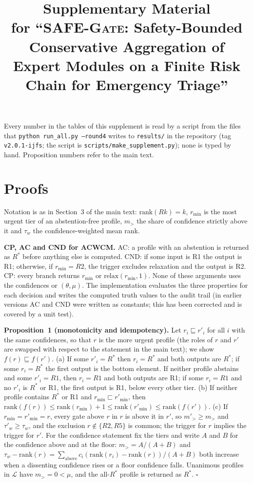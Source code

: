 \documentclass[11pt,a4paper]{article}%
\newcommand{\safegate}{\textsc{SAFE-Gate}}
\theoremstyle{plain}%
\theoremstyle{remark}%
\begin{document}
\title{Supplementary Material\\[2pt] \large for ``\safegate{}: Safety-Bounded Conservative Aggregation of Expert Modules on a Finite Risk Chain for Emergency Triage''}
\author{}
\date{}
\maketitle

Every number in the tables of this supplement is read by a script from the files that \texttt{python run\_all.py --round4} writes to \texttt{results/} in the repository (tag \texttt{v2.0.1-ijfs}; the script is \texttt{scripts/make\_supplement.py}); none is typed by hand. Proposition numbers refer to the main text.

\section{Proofs}\label{sup:proofs}

Notation is as in Section~3 of the main text: $\text{rank}(Rk)=k$, $r_{\min}$ is the most urgent tier of an abstention-free profile, $m_>$ the share of confidence strictly above it and $\tau_w$ the confidence-weighted mean rank.

\textbf{CP, AC and CND for ACWCM.} AC: a profile with an abstention is returned as $R^*$ before anything else is computed. CND: if some input is R1 the output is R1; otherwise, if $r_{\min}=R2$, the trigger excludes relaxation and the output is R2. CP: every branch returns $r_{\min}$ or $\text{relax}(r_{\min},1)$. None of these arguments uses the confidences or $(\theta,\mu)$. The implementation evaluates the three properties for each decision and writes the computed truth values to the audit trail (in earlier versions AC and CND were written as constants; this has been corrected and is covered by a unit test).

\textbf{Proposition~1 (monotonicity and idempotency).} Let $r_i\sqsubseteq r'_i$ for all $i$ with the same confidences, so that $r$ is the more urgent profile (the roles of $r$ and $r'$ are swapped with respect to the statement in the main text); we show $f(r)\sqsubseteq f(r')$. (a) If some $r'_i=R^*$ then $r_i=R^*$ and both outputs are $R^*$; if some $r_i=R^*$ the first output is the bottom element. If neither profile abstains and some $r'_i=R1$, then $r_i=R1$ and both outputs are R1; if some $r_i=R1$ and no $r'_i$ is $R^*$ or R1, the first output is R1, below every other tier. (b) If neither profile contains $R^*$ or R1 and $r_{\min}\sqsubset r'_{\min}$, then $\text{rank}(f(r))\le\text{rank}(r_{\min})+1\le\text{rank}(r'_{\min})\le\text{rank}(f(r'))$. (c) If $r_{\min}=r'_{\min}=r$, every gate above $r$ in $r$ is above it in $r'$, so $m'_>\ge m_>$ and $\tau'_w\ge\tau_w$, and the exclusion $r\notin\{R2,R5\}$ is common; the trigger for $r$ implies the trigger for $r'$. For the confidence statement fix the tiers and write $A$ and $B$ for the confidence above and at the floor: $m_>=A/(A+B)$ and $\tau_w-\text{rank}(r)=\sum_{\text{above}}c_i(\text{rank}(r_i)-\text{rank}(r))/(A+B)$ both increase when a dissenting confidence rises or a floor confidence falls. Unanimous profiles in $\mathcal{L}$ have $m_>=0<\mu$, and the all-$R^*$ profile is returned as $R^*$. $\square$
\end{document}
